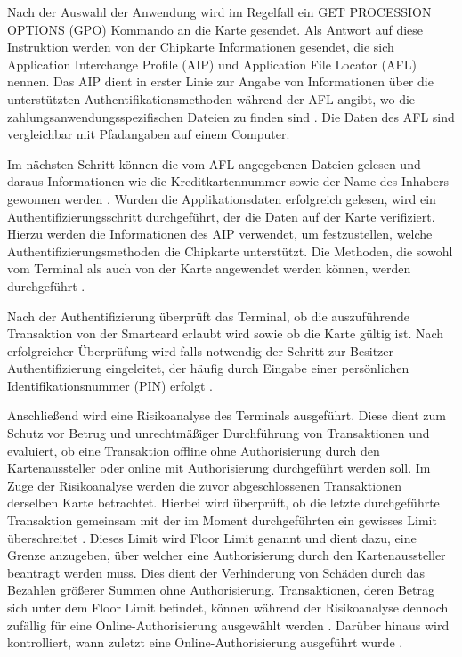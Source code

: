 Nach der Auswahl der Anwendung wird im Regelfall ein GET PROCESSION OPTIONS (GPO) Kommando an die Karte gesendet. Als Antwort auf diese Instruktion werden von der Chipkarte Informationen gesendet, die sich Application Interchange Profile (AIP) und Application File Locator (AFL) nennen. Das AIP dient in erster Linie zur Angabe von Informationen über die unterstützten Authentifikationsmethoden während der AFL angibt,  wo die zahlungsanwendungsspezifischen Dateien zu finden sind \cite{getInfoEmvJava, emvbook3}. Die Daten des AFL sind vergleichbar mit Pfadangaben auf einem Computer. 

Im nächsten Schritt können die vom AFL angegebenen Dateien gelesen und daraus Informationen wie die Kreditkartennummer sowie der Name des Inhabers gewonnen werden \cite{getInfoEmvJava}. Wurden die Applikationsdaten erfolgreich gelesen, wird ein Authentifizierungsschritt durchgeführt, der die Daten auf der Karte verifiziert. Hierzu werden die Informationen des AIP verwendet, um festzustellen, welche Authentifizierungsmethoden die Chipkarte unterstützt. Die Methoden, die sowohl vom Terminal als auch von der Karte angewendet werden können, werden durchgeführt \cite{howemvpaymentworks}. 

Nach der Authentifizierung überprüft das Terminal, ob die auszuführende Transaktion von der Smartcard erlaubt wird sowie ob die Karte gültig ist. Nach erfolgreicher Überprüfung wird falls notwendig der Schritt zur Besitzer-Authentifizierung eingeleitet, der häufig durch Eingabe einer persönlichen Identifikationsnummer (PIN) erfolgt \cite{howemvpaymentworks}.

Anschließend wird eine Risikoanalyse des Terminals ausgeführt. Diese dient zum Schutz vor Betrug und unrechtmäßiger Durchführung von Transaktionen und evaluiert, ob eine Transaktion offline ohne Authorisierung durch den Kartenaussteller oder online mit Authorisierung durchgeführt werden soll. Im Zuge der Risikoanalyse werden die zuvor abgeschlossenen Transaktionen derselben Karte betrachtet. Hierbei wird überprüft, ob die letzte durchgeführte Transaktion gemeinsam mit der im Moment durchgeführten ein gewisses Limit überschreitet \cite{emvbook3}. Dieses Limit wird Floor Limit genannt und dient dazu, eine Grenze anzugeben, über welcher eine Authorisierung durch den Kartenaussteller beantragt werden muss. Dies dient der Verhinderung von Schäden durch das Bezahlen größerer Summen ohne Authorisierung. Transaktionen, deren Betrag sich unter dem Floor Limit befindet, können während der Risikoanalyse dennoch zufällig für eine Online-Authorisierung ausgewählt werden \cite{emvbook3, posRiskManagement}. Darüber hinaus wird kontrolliert, wann zuletzt eine Online-Authorisierung ausgeführt wurde \cite{emvbook3}.

